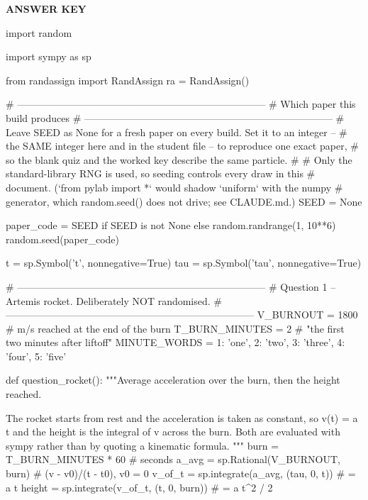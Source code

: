 \documentclass[12pt]{exam}
\renewcommand{\examnum}{CO1b (v1)}
\begin{document}
\assessmentheader
\pagestyle{headandfoot}

\begin{center}\textbf{\large ANSWER KEY}\end{center}


\begin{pycode}
import random

import sympy as sp

from randassign import RandAssign
ra = RandAssign()

# ---------------------------------------------------------------------------
# Which paper this build produces
# ---------------------------------------------------------------------------
# Leave SEED as None for a fresh paper on every build.  Set it to an integer --
# the SAME integer here and in the student file -- to reproduce one exact paper,
# so the blank quiz and the worked key describe the same particle.
#
# Only the standard-library RNG is used, so seeding controls every draw in this
# document.  (`from pylab import *` would shadow `uniform` with the numpy
# generator, which random.seed() does not drive; see CLAUDE.md.)
SEED = None

paper_code = SEED if SEED is not None else random.randrange(1, 10**6)
random.seed(paper_code)

t = sp.Symbol('t', nonnegative=True)
tau = sp.Symbol('tau', nonnegative=True)


# ---------------------------------------------------------------------------
# Question 1 -- Artemis rocket.  Deliberately NOT randomised.
# ---------------------------------------------------------------------------
V_BURNOUT = 1800        # m/s reached at the end of the burn
T_BURN_MINUTES = 2      # "the first two minutes after liftoff"
MINUTE_WORDS = {1: 'one', 2: 'two', 3: 'three', 4: 'four', 5: 'five'}


def question_rocket():
    """Average acceleration over the burn, then the height reached.

    The rocket starts from rest and the acceleration is taken as constant, so
    v(t) = a t and the height is the integral of v across the burn.  Both are
    evaluated with sympy rather than by quoting a kinematic formula.
    """
    burn = T_BURN_MINUTES * 60                        # seconds
    a_avg = sp.Rational(V_BURNOUT, burn)              # (v - v0)/(t - t0), v0 = 0
    v_of_t = sp.integrate(a_avg, (tau, 0, t))         # = a t
    height = sp.integrate(v_of_t, (t, 0, burn))       # = a t^2 / 2


\end{pycode}
\end{document}
